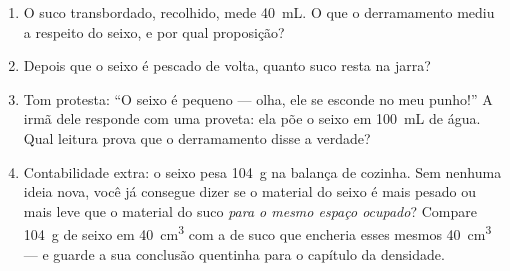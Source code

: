 \begin{problem}
\begin{enumerate}[resume]
  \item O suco transbordado, recolhido, mede \qty{40}{mL}. O que o
        derramamento mediu a respeito do seixo, e por qual
        proposição?
  \item Depois que o seixo é pescado de volta, quanto suco resta na
        jarra?
  \item Tom protesta: ``O seixo é pequeno --- olha, ele se esconde no
        meu punho!'' A irmã dele responde com uma proveta: ela põe o
        seixo em \qty{100}{mL} de água. Qual leitura prova que o
        derramamento disse a verdade?
  \item Contabilidade extra: o seixo pesa \qty{104}{g} na balança de
        cozinha. Sem nenhuma ideia nova, você já consegue dizer se o
        material do seixo é mais pesado ou mais leve que o material
        do suco \emph{para o mesmo espaço ocupado}? Compare
        \qty{104}{g} de seixo em \qty{40}{cm^3} com a  de suco
        que encheria esses mesmos \qty{40}{cm^3} --- e guarde a sua
        conclusão quentinha para o capítulo da densidade.
\end{enumerate}
\end{problem}

